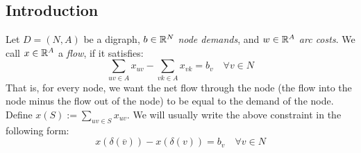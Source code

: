 \subsection{Introduction}
Let $D = (N,A)$ be a digraph, $b \in \mathbb{R}^N$ \textit{node demands}, and $w \in \mathbb{R}^A$ \textit{arc costs}. We call $x \in \mathbb{R}^A$ a \textit{flow}, if it satisfies:
\begin{equation*}
  \sum_{uv \in A} x_{uv} - \sum_{vk \in A} x_{vk} = b_v \quad \forall v \in N
\end{equation*}
That is, for every node, we want the net flow through the node (the flow into the node minus the flow out of the node) to be equal to the demand of the node.
Define $x(S) := \sum_{uv \in S} x_{uv}$. We will usually write the above constraint in the following form:
\begin{equation*}
 x(\delta(\overline{v})) - x(\delta(v)) = b_v \quad \forall v \in N
\end{equation*}

